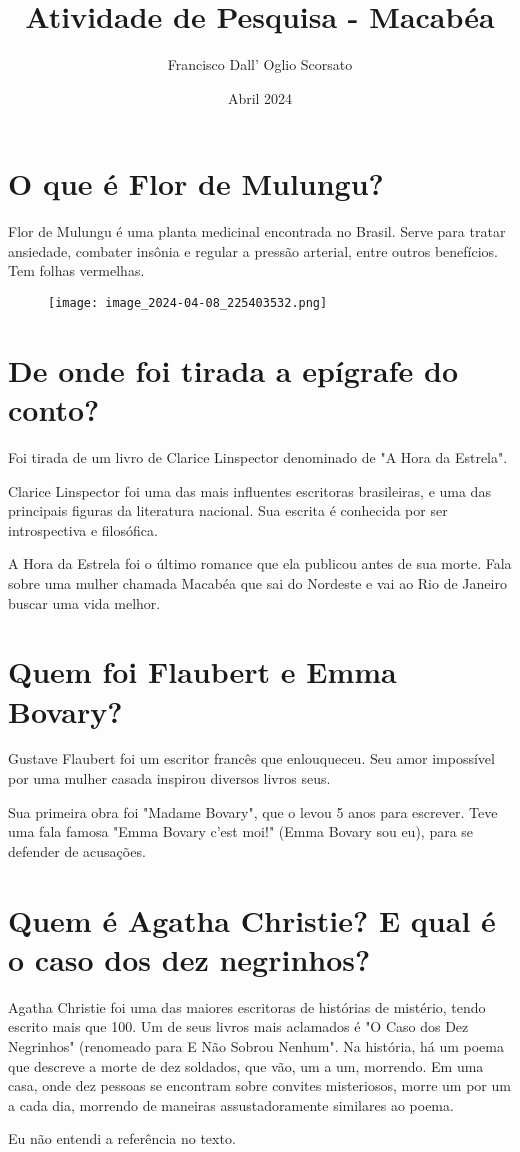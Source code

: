 \documentclass{article}
\title{Atividade de Pesquisa - Macabéa}
\author{Francisco Dall' Oglio Scorsato}
\date{Abril 2024}
\begin{document}
\maketitle
\section{O que é Flor de Mulungu?}
\hspace{\parindent}Flor de Mulungu é uma planta medicinal encontrada no Brasil. Serve para tratar ansiedade, combater insônia e regular a pressão arterial, entre outros benefícios. Tem folhas vermelhas.
\begin{figure}[h]
    \centering
    \texttt{[image: image\_2024-04-08\_225403532.png]}
\end{figure}
\section{De onde foi tirada a epígrafe do conto?}
\hspace{\parindent}Foi tirada de um livro de Clarice Linspector denominado de "A Hora da Estrela".
\par Clarice Linspector foi uma das mais influentes escritoras brasileiras, e uma das principais figuras da literatura nacional. Sua escrita é conhecida por ser introspectiva e filosófica. 
\par A Hora da Estrela foi o último romance que ela publicou antes de sua morte. Fala sobre uma mulher chamada Macabéa que sai do Nordeste e vai ao Rio de Janeiro buscar uma vida melhor. 

\section{Quem foi Flaubert e Emma Bovary?}
\hspace{\parindent}Gustave Flaubert foi um escritor francês que enlouqueceu. Seu amor impossível por uma mulher casada inspirou diversos livros seus. 
\par Sua primeira obra foi "Madame Bovary", que o levou 5 anos para escrever. Teve uma fala famosa "Emma Bovary c'est moi!"  (Emma Bovary sou eu), para se defender de acusações.

\section{Quem é Agatha Christie? E qual é o caso dos dez negrinhos?}
\hspace{\parindent}Agatha Christie foi uma das maiores escritoras de histórias de mistério, tendo escrito mais que 100. Um de seus livros mais aclamados é "O Caso dos Dez Negrinhos" (renomeado para E Não Sobrou Nenhum". Na história, há um poema que descreve a morte de dez soldados, que vão, um a um, morrendo. Em uma casa, onde dez pessoas se encontram sobre convites misteriosos, morre um por um a cada dia, morrendo de maneiras assustadoramente similares ao poema.
\par Eu não entendi a referência no texto.
\end{document}
